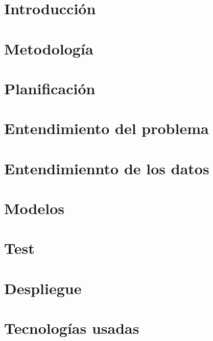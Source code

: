 \documentclass[openright,twoside,10pt]{book}
\begin{document}
\printglossary[title=Glosario de términos, toctitle=Glosario de términos]
\glsaddall
\clearpage

\printglossary[type=\acronymtype]

\chapter{Introducción}\label{cap.introduccion}



\chapter{Metodología}\label{cap.metologia}


\chapter{Planificación}
\label{cap.req-planificacion}

\chapter{Entendimiento del problema}\label{cap.ent.problema}


\chapter{Entendimiennto de los datos}\label{cap.ent-datos}


\chapter{Modelos}\label{cap.modelos}


\chapter{Test}\label{cap.test}


\chapter{Despliegue}\label{cap.despliegue}



\chapter{Tecnologías usadas}\label{cap.tecnologias}

\end{document}
